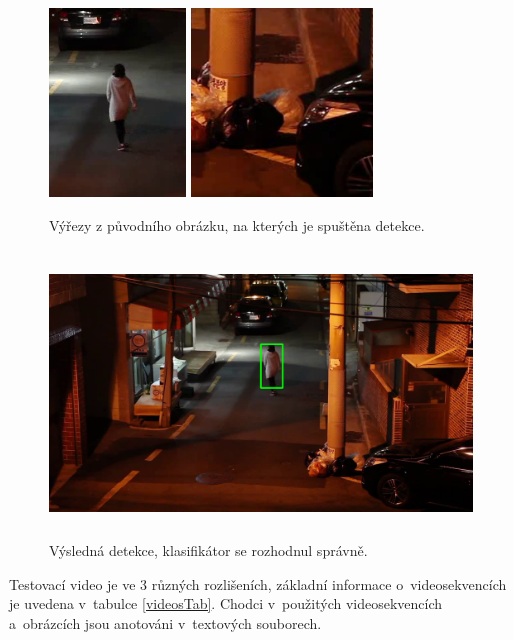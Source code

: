 \begin{figure}[H]
\centering
\includegraphics[keepaspectratio, max height=5cm,]{figures/mog/2}%
\vspace{0.0001cm}
\centering
\includegraphics[keepaspectratio, max height=5cm,]{figures/mog/1}%
\caption{Výřezy z původního obrázku, na kterých je spuštěna detekce.}
\label{fig:mogExample2}
\end{figure}
\begin{figure}[H]
\centering
\includegraphics[keepaspectratio, max height=7.6cm,]{figures/mog/detect}%
\caption{Výsledná detekce, klasifikátor se rozhodnul správně.}
\label{fig:mogExample3}
\end{figure}
Testovací video \cite{testvideo} je ve 3 různých rozlišeních, základní informace o~videosekvencích je uvedena v~tabulce \ref{videosTab}.
Chodci v~použitých videosekvencích a~obrázcích jsou anotováni v~textových souborech.
